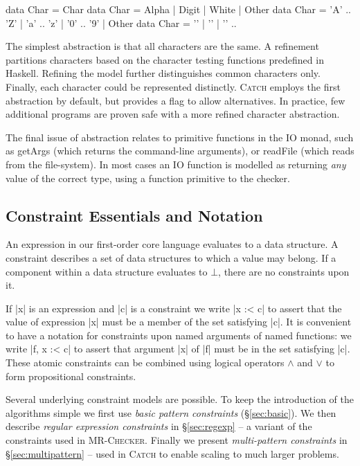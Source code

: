 \documentclass[preprint]{sigplanconf}
\newcommand{\C}[1]{\textsf{#1}}
\newcommand{\catch}{\textsc{Catch}}
\newcommand{\newtool}{\anon{\catch07}{\catch}}
\newcommand{\oldtool}{\anon{\catch05}{\textsc{MR-Checker}}}
\newcommand{\anon}[2]{#2}
\begin{document}
\begin{code}
data Char = Char
data Char = Alpha | Digit | White | Other
data Char = 'A' .. 'Z' | 'a' .. 'z' | '0' .. '9' | Other
data Char = '\0' | '\1' | '\2' ..
\end{code}

\noindent The simplest abstraction is that all characters are the same. A refinement partitions characters based on the character testing functions predefined in Haskell. Refining the model further distinguishes common characters only. Finally, each character could be represented distinctly. \catch{} employs the first abstraction by default, but provides a flag to allow alternatives. In practice, few additional programs are proven safe with a more refined character abstraction.

The final issue of abstraction relates to primitive functions in the \C{IO} monad, such as \C{getArgs} (which returns the command-line arguments), or \C{readFile} (which reads from the file-system). In most cases an IO function is modelled as returning \textit{any} value of the correct type, using a function primitive to the checker.


\subsection{Constraint Essentials and Notation}
\label{sec:constraints}

An expression in our first-order core language evaluates to a data structure. A constraint describes a set of data structures to which a value may belong. If a component within a data structure evaluates to $\bot{}$, there are no constraints upon it.

If |x| is an expression and |c| is a constraint we write |x :< c| to assert that the value of expression |x| must be a member of the set satisfying |c|. It is convenient to have a notation for constraints upon named arguments of named functions: we write |f, x :< c| to assert that argument |x| of |f| must be in the set satisfying |c|. These atomic constraints can be combined using logical operators $\wedge{}$ and $\vee{}$ to form propositional constraints.

Several underlying constraint models are possible. To keep the introduction of the algorithms simple we first use \textit{basic pattern constraints} (\S\ref{sec:basic}). We then describe \textit{regular expression constraints} in \S\ref{sec:regexp} -- a variant of the constraints used in \oldtool{}. Finally we present \textit{multi-pattern constraints} in \S\ref{sec:multipattern} -- used in \newtool{} to enable scaling to much larger problems.
\end{document}
